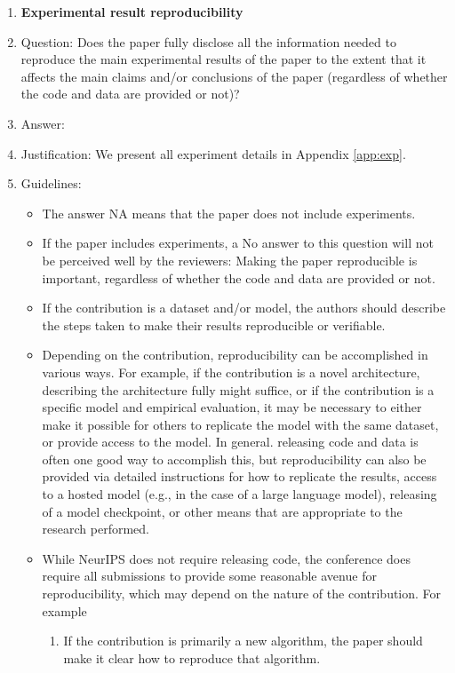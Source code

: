 \documentclass{article}
\theoremstyle{plain}
\begin{document}
\begin{enumerate}
    \item {\bf Experimental result reproducibility}
    \item[] Question: Does the paper fully disclose all the information needed to reproduce the main experimental results of the paper to the extent that it affects the main claims and/or conclusions of the paper (regardless of whether the code and data are provided or not)?
    \item[] Answer: \answerYes{}
    \item[] Justification: We present all experiment details in Appendix \ref{app:exp}.
    \item[] Guidelines:
    \begin{itemize}
        \item The answer NA means that the paper does not include experiments.
        \item If the paper includes experiments, a No answer to this question will not be perceived well by the reviewers: Making the paper reproducible is important, regardless of whether the code and data are provided or not.
        \item If the contribution is a dataset and/or model, the authors should describe the steps taken to make their results reproducible or verifiable. 
        \item Depending on the contribution, reproducibility can be accomplished in various ways. For example, if the contribution is a novel architecture, describing the architecture fully might suffice, or if the contribution is a specific model and empirical evaluation, it may be necessary to either make it possible for others to replicate the model with the same dataset, or provide access to the model. In general. releasing code and data is often one good way to accomplish this, but reproducibility can also be provided via detailed instructions for how to replicate the results, access to a hosted model (e.g., in the case of a large language model), releasing of a model checkpoint, or other means that are appropriate to the research performed.
        \item While NeurIPS does not require releasing code, the conference does require all submissions to provide some reasonable avenue for reproducibility, which may depend on the nature of the contribution. For example
        \begin{enumerate}
            \item If the contribution is primarily a new algorithm, the paper should make it clear how to reproduce that algorithm.

\end{enumerate}
\end{itemize}
\end{enumerate}
\end{document}
